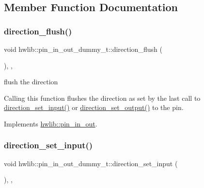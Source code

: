 \subsection{Member Function Documentation}
\mbox{\label{classhwlib_1_1pin__in__out__dummy__t_ad33911be9133dd967220eac92b232c78}} 
\subsubsection{\texorpdfstring{direction\+\_\+flush()}{direction\_flush()}}
{\footnotesize\ttfamily void hwlib\+::pin\+\_\+in\+\_\+out\+\_\+dummy\+\_\+t\+::direction\+\_\+flush (\begin{DoxyParamCaption}{ }\end{DoxyParamCaption})\hspace{0.3cm}{\ttfamily [inline]}, {\ttfamily [override]}, {\ttfamily [virtual]}}

flush the direction

Calling this function flushes the direction as set by the last call to \hyperlink{classhwlib_1_1pin__in__out__dummy__t_af5f3e57b6496dc0e523fe6000e2caefc}{direction\+\_\+set\+\_\+input()} or \hyperlink{classhwlib_1_1pin__in__out__dummy__t_a065ca763bd00d4cd6bf3fd11610779db}{direction\+\_\+set\+\_\+output()} to the pin. 

Implements \hyperlink{classhwlib_1_1pin__in__out_a86ef2b296683d8c0133280075c82cb51}{hwlib\+::pin\+\_\+in\+\_\+out}.

\mbox{\label{classhwlib_1_1pin__in__out__dummy__t_af5f3e57b6496dc0e523fe6000e2caefc}} 
\subsubsection{\texorpdfstring{direction\+\_\+set\+\_\+input()}{direction\_set\_input()}}
{\footnotesize\ttfamily void hwlib\+::pin\+\_\+in\+\_\+out\+\_\+dummy\+\_\+t\+::direction\+\_\+set\+\_\+input (\begin{DoxyParamCaption}{ }\end{DoxyParamCaption})\hspace{0.3cm}{\ttfamily [inline]}, {\ttfamily [override]}, {\ttfamily [virtual]}}


